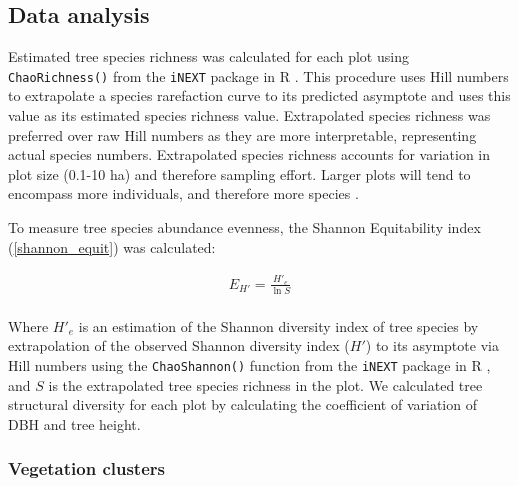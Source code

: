 \documentclass[11pt,a4paper]{article}
\begin{document}
% 
% 

\subsection{Data analysis}
Estimated tree species richness was calculated for each plot using \verb|ChaoRichness()| from the \verb|iNEXT| package in R \citep{Hsieh2016}. This procedure uses Hill numbers to extrapolate a species rarefaction curve to its predicted asymptote and uses this value as its estimated species richness value. Extrapolated species richness was preferred over raw Hill numbers as they are more interpretable, representing actual species numbers. Extrapolated species richness accounts for variation in plot size (0.1-10 ha) and therefore sampling effort. Larger plots will tend to encompass more individuals, and therefore more species \citep{Dengler2009}.

To measure tree species abundance evenness, the Shannon Equitability index \citep{} (\autoref{shannon_equit}) was calculated: 

\begin{equation}
	\begin{gathered}
		E_{H'} = \frac{H'_{e}}{\ln{S}} \\
	\end{gathered}
	\label{shannon_equit}
\end{equation}

Where $H'_{e}$ is an estimation of the Shannon diversity index of tree species by extrapolation of the observed Shannon diversity index ($H'$) to its asymptote via Hill numbers using the \verb|ChaoShannon()| function from the \verb|iNEXT| package in R \citep{Hsieh2016}, and $S$ is the extrapolated tree species richness in the plot. We calculated tree structural diversity for each plot by calculating the coefficient of variation of DBH and tree height. 

\subsubsection{Vegetation clusters}
\end{document}
